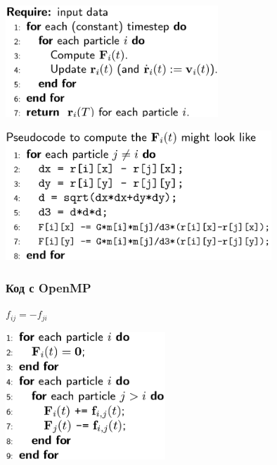 \documentclass{beamer}
\begin{document}
\begin{frame}
  \includegraphics[width=0.6\textwidth]{pseudo-code}\pause
  
  \includegraphics[width=0.75\textwidth]{pseudo-code-c}
\end{frame}

\begin{frame}
  \frametitle{Код с OpenMP}
  $f_{ij} = -f_{ji}$

  \includegraphics[width=0.45\textwidth]{pseudo-code1}
\end{frame}
\end{document}
